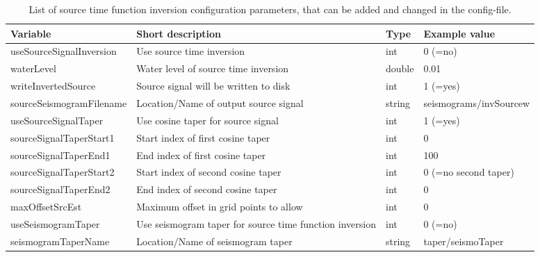 \documentclass[pdftex,a4paper,parskip,listof=totoc,bibliography=totoc,onehalfspacing,12pt]{scrreprt}
\begin{document}
\begin{table}[h!]
\caption[List of source time function inversion configuration parameters.]{List of source time function inversion configuration parameters, that can be added and changed in the config-file.}\label{tab:config_sourcetime}
\centering
\begin{adjustbox}{width=1\textwidth,center=\textwidth}
	\begin{tabular}{llll}
	\toprule
         Variable                 & Short description                                                   & Type   & Example value \\
	\midrule
         useSourceSignalInversion & Use source time inversion                                           &  int   & 0 (=no) \\
         waterLevel               & Water level of source time inversion                                & double & 0.01 \\
         writeInvertedSource      & Source signal will be written to disk                               &  int   & 1 (=yes) \\
         sourceSeismogramFilename & Location/Name of output source signal                               & string & seismograms/invSourcew \\
         useSourceSignalTaper     & Use cosine taper for source signal                                  &  int   & 1 (=yes) \\
         sourceSignalTaperStart1  & Start index of first cosine taper                                   &  int   & 0 \\
         sourceSignalTaperEnd1    & End index of first cosine taper                                     &  int   & 100 \\
         sourceSignalTaperStart2  & Start index of second cosine taper                                  &  int   & 0 (=no second taper) \\
         sourceSignalTaperEnd2    & End index of second cosine taper                                    &  int   & 0 \\
         maxOffsetSrcEst          & Maximum offset in grid points to allow                              &  int   & 0 \\
         useSeismogramTaper       & Use seismogram taper for source time function inversion                   &  int   & 0 (=no) \\
         seismogramTaperName      & Location/Name of seismogram taper                                   & string & taper/seismoTaper \\
	\bottomrule
	\end{tabular}
	\end{adjustbox}
\end{table}
\end{document}
